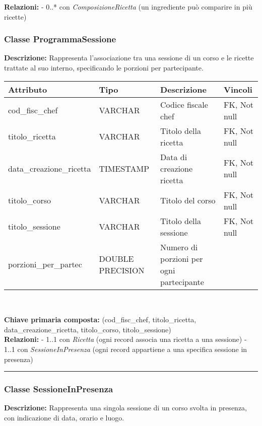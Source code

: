 \documentclass[a4paper, 12pt]{article}
\begin{document}
        \noindent\textbf{Relazioni:}  
        - 0..* con \textit{ComposizioneRicetta} (un ingrediente può comparire in più ricette)

    \newpage

    \subsubsection*{Classe ProgrammaSessione}
        \textbf{Descrizione:} Rappresenta l’associazione tra una sessione di un corso e le ricette trattate al suo interno, specificando le porzioni per partecipante.
        
        {
        \vspace{1em}
        \renewcommand{\arraystretch}{1.3}
        \begin{tabularx}{\textwidth}{|l|l|X|l|}
        \hline
        \textbf{Attributo} & \textbf{Tipo} & \textbf{Descrizione} & \textbf{Vincoli} \\
        \hline
        cod\_fisc\_chef       & VARCHAR      & Codice fiscale chef & FK, Not null \\
        titolo\_ricetta       & VARCHAR      & Titolo della ricetta & FK, Not null \\
        data\_creazione\_ricetta & TIMESTAMP & Data di creazione ricetta & FK, Not null \\
        titolo\_corso         & VARCHAR      & Titolo del corso & FK, Not null \\
        titolo\_sessione      & VARCHAR      & Titolo della sessione & FK, Not null \\
        porzioni\_per\_partec & DOUBLE PRECISION & Numero di porzioni per ogni partecipante & \\
        \hline
        \end{tabularx}\\[0.5em]
        }
        
        \noindent\textbf{Chiave primaria composta:}  
        (cod\_fisc\_chef, titolo\_ricetta, data\_creazione\_ricetta, titolo\_corso, titolo\_sessione)\\[0.1em]
        
        \noindent\textbf{Relazioni:}  
        - 1..1 con \textit{Ricetta} (ogni record associa una ricetta a una sessione)  
        - 1..1 con \textit{SessioneInPresenza} (ogni record appartiene a una specifica sessione in presenza)

    \noindent\rule{\textwidth}{0.1pt}

    \subsubsection*{Classe SessioneInPresenza}
        \textbf{Descrizione:} Rappresenta una singola sessione di un corso svolta in presenza, con indicazione di data, orario e luogo.
        
\end{document}
